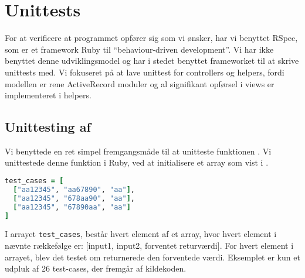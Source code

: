 \section{Unittests}
\label{sec:unittests}
For at verificere at programmet opfører sig som vi ønsker, har vi benyttet RSpec, som er et framework Ruby til ``behaviour-driven development''. Vi har ikke benyttet denne udviklingsmodel og har i stedet benyttet frameworket til at skrive unittests med.
Vi fokuseret på at lave unittest for controllers og helpers, fordi modellen er rene ActiveRecord moduler og al signifikant opførsel i views er implementeret i helpers.

\subsection{Unittesting af }
Vi benyttede en ret simpel fremgangsmåde til at unitteste funktionen . Vi unittestede denne funktion i Ruby, ved at initialisere et array som vist i .

\begin{lstlisting}[caption={Et eksempel på en række testcases til brug ved unittesting.},label=lst:testcases,language=Ruby]
test_cases = [
  ["aa12345", "aa67890", "aa"],
  ["aa12345", "678aa90", "aa"],
  ["aa12345", "67890aa", "aa"]
]
\end{lstlisting}

I arrayet \texttt{test\_cases}, består hvert element af et array, hvor hvert element i nævnte rækkefølge er: [input1, input2, forventet returværdi].
For hvert element i arrayet, blev det testet om  returnerede den forventede værdi. Eksemplet er kun et udpluk af 26 test-cases, der fremgår af kildekoden.
